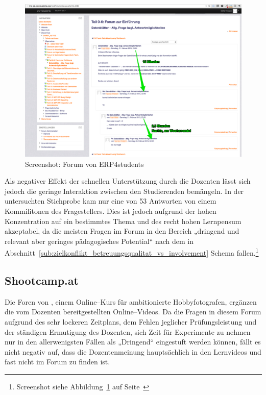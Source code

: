\begin{figure}[p]
\begin{center}
\includegraphics[width=\textwidth]{erp4students.jpg}
\caption{Screenshot: Forum von ERP4students}
\label{fig:erp4s}
\end{center}
\end{figure}

Als negativer Effekt der schnellen Unterstützung durch die Dozenten lässt sich jedoch die geringe Interaktion zwischen den Studierenden bemängeln. In der untersuchten Stichprobe kam nur eine von 53 Antworten von einem Kommilitonen des Fragestellers. Dies ist jedoch aufgrund der hohen Konzentration auf ein bestimmtes Thema und des recht hohen Lernpensum akzeptabel, da die meisten Fragen im Forum in den Bereich „dringend und relevant aber geringes pädagogisches Potential“ nach dem in Abschnitt~\ref{sub:zielkonflikt_betreuungsqualitat_vs_involvement} Schema fallen.\footnote{Screenshot siehe Abbildung~\ref{fig:erp4s} auf Seite~\pageref{fig:erp4s}}

\subsection{Shootcamp.at} %
\label{sub:shootcamp_at}

Die Foren von , einem Online–Kurs für ambitionierte Hobbyfotografen, ergänzen die vom Dozenten bereitgestellten Online–Videos. Da die Fragen in diesem Forum aufgrund des sehr lockeren Zeitplans, dem Fehlen jeglicher Prüfungsleistung und der ständigen Ermutigung des Dozenten, sich Zeit für Experimente zu nehmen nur in den allerwenigsten Fällen als „Dringend“ eingestuft werden können, fällt es nicht negativ auf, dass die Dozentenmeinung hauptsächlich in den Lernvideos und fast nicht im Forum zu finden ist. 


